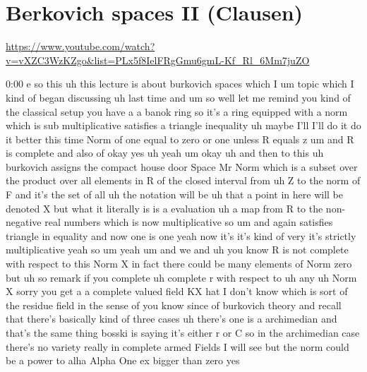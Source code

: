 
\section{\ufs Berkovich spaces II (Clausen)}

\url{https://www.youtube.com/watch?v=vXZC3WzKZgo&list=PLx5f8IelFRgGmu6gmL-Kf_Rl_6Mm7juZO}
\renewcommand{\yt}[2]{\href{https://www.youtube.com/watch?v=vXZC3WzKZgo&list=PLx5f8IelFRgGmu6gmL-Kf_Rl_6Mm7juZO&t=#1}{#2}}
\vspace{1em}

\begin{unfinished}{0:00}
e  so  this  uh  this  lecture  is  about
burkovich  spaces  which
I  um  topic  which
I  kind  of  began  discussing  uh  last  time
and
um
so  well  let  me  remind  you  kind  of  the
classical  setup  you  have
a  a  banok
ring  so  it's  a  ring  equipped  with  a  norm
which
is  sub  multiplicative  satisfies  a
triangle
inequality  uh  maybe  I'll  I'll  do  it  do
it  better  this  time  Norm  of  one  equal  to
zero  or
one  unless  R  equals  z  um  and  R  is
complete  and  also
of
okay  yes
uh
yeah
um  okay  uh  and  then  to  this  uh  burkovich
assigns  the  compact  house  door
Space  Mr  Norm  which  is  a  subset  over  the
product  over  all  elements  in  R  of  the
closed  interval  from  uh  Z  to  the  norm  of
F  and  it's  the  set  of
all  uh  the  notation  will
be  uh  that  a  point  in  here  will  be
denoted  X  but  what  it  literally  is  is  a
evaluation  uh  a  map  from  R  to  the  non-
negative  real  numbers  which  is  now
multiplicative
so
um  and  again  satisfies  triangle  in
equality  and  now  one  is  one  yeah  now
it's  it's  kind  of  very  it's  strictly
multiplicative  yeah  so  um  yeah  um  and  we
and  uh  you  know  R  is  not  complete  with
respect  to  this  Norm  X  in  fact  there
could  be  many  elements  of  Norm  zero  but
uh  so
remark  if
you
complete  uh  complete  r  with  respect
to  uh
any  uh  Norm  X
sorry  you  get
a  a  complete  valued
field  KX  hat  I  don't  know  which  is  sort
of  the  residue  field  in  the  sense  of  you
know  since  of  burkovich  theory  and
recall  that  there's  basically  kind  of
three  cases
uh  there's  one  is  a  archimedian
and  that's  the  same  thing  bosski  is
saying  it's  either  r  or  C  so  in  the
archimedian  case  there's  no  variety
really  in  complete  armed  Fields  I  will
see  but  the  norm  could  be  a  power  to
alha  Alpha  One  ex  bigger  than  zero  yes

\end{unfinished}
